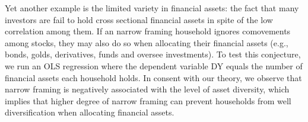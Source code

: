 \documentclass[ukenglish,nottitlepage,thmsb,11pt,letterpaper]{article}
\begin{document}
Yet another example is the limited variety in financial assets: the fact that many investors are fail to hold cross sectional financial assets in spite of the low correlation among them. If an narrow framing household ignores comovements among stocks, they may also do so when allocating their financial assets (e.g., bonds, golds, derivatives, funds and oversee investments). To test this conjecture, we run an OLS regression where the dependent variable DY equals the number of financial assets each household holds. In consent with our theory, we observe that narrow framing is negatively associated with the level of asset diversity, which implies that higher degree of narrow framing can prevent households from well diversification when allocating financial assets. \\
                                                                                                                
\end{document}
